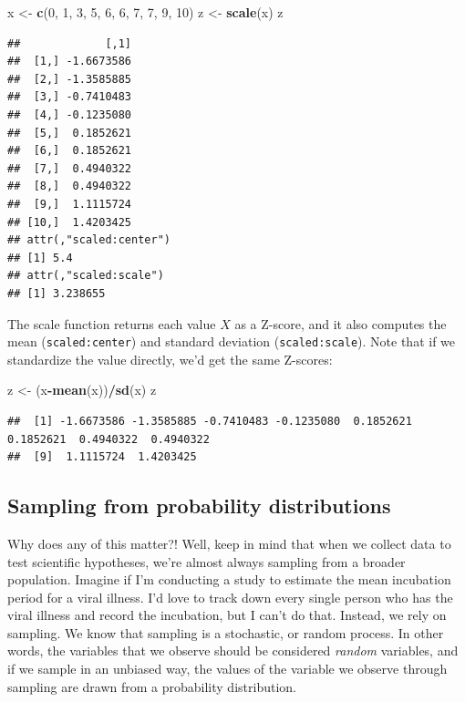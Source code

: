 \documentclass[
]{book}
\newenvironment{Shaded}{\begin{snugshade}}{\end{snugshade}}
\newcommand{\DecValTok}[1]{\textcolor[rgb]{0.00,0.00,0.81}{#1}}
\newcommand{\FunctionTok}[1]{\textcolor[rgb]{0.13,0.29,0.53}{\textbf{#1}}}
\newcommand{\NormalTok}[1]{#1}
\newcommand{\OtherTok}[1]{\textcolor[rgb]{0.56,0.35,0.01}{#1}}
\newcommand{\SpecialCharTok}[1]{\textcolor[rgb]{0.81,0.36,0.00}{\textbf{#1}}}
\begin{document}
\begin{Shaded}
\begin{Highlighting}[]
\NormalTok{x }\OtherTok{\textless{}{-}} \FunctionTok{c}\NormalTok{(}\DecValTok{0}\NormalTok{, }\DecValTok{1}\NormalTok{, }\DecValTok{3}\NormalTok{, }\DecValTok{5}\NormalTok{, }\DecValTok{6}\NormalTok{, }\DecValTok{6}\NormalTok{, }\DecValTok{7}\NormalTok{, }\DecValTok{7}\NormalTok{, }\DecValTok{9}\NormalTok{, }\DecValTok{10}\NormalTok{)}
\NormalTok{z }\OtherTok{\textless{}{-}} \FunctionTok{scale}\NormalTok{(x)}
\NormalTok{z}
\end{Highlighting}
\end{Shaded}

\begin{verbatim}
##             [,1]
##  [1,] -1.6673586
##  [2,] -1.3585885
##  [3,] -0.7410483
##  [4,] -0.1235080
##  [5,]  0.1852621
##  [6,]  0.1852621
##  [7,]  0.4940322
##  [8,]  0.4940322
##  [9,]  1.1115724
## [10,]  1.4203425
## attr(,"scaled:center")
## [1] 5.4
## attr(,"scaled:scale")
## [1] 3.238655
\end{verbatim}

The scale function returns each value \(X\) as a Z-score, and it also computes the mean (\texttt{scaled:center}) and standard deviation (\texttt{scaled:scale}). Note that if we standardize the value directly, we'd get the same Z-scores:

\begin{Shaded}
\begin{Highlighting}[]
\NormalTok{z }\OtherTok{\textless{}{-}}\NormalTok{ (x}\SpecialCharTok{{-}}\FunctionTok{mean}\NormalTok{(x))}\SpecialCharTok{/}\FunctionTok{sd}\NormalTok{(x)}
\NormalTok{z}
\end{Highlighting}
\end{Shaded}

\begin{verbatim}
##  [1] -1.6673586 -1.3585885 -0.7410483 -0.1235080  0.1852621  0.1852621  0.4940322  0.4940322
##  [9]  1.1115724  1.4203425
\end{verbatim}

\subsection{Sampling from probability distributions}\label{sampling-from-probability-distributions}

Why does any of this matter?! Well, keep in mind that when we collect data to test scientific hypotheses, we're almost always sampling from a broader population. Imagine if I'm conducting a study to estimate the mean incubation period for a viral illness. I'd love to track down every single person who has the viral illness and record the incubation, but I can't do that. Instead, we rely on sampling. We know that sampling is a stochastic, or random process. In other words, the variables that we observe should be considered \emph{random} variables, and if we sample in an unbiased way, the values of the variable we observe through sampling are drawn from a probability distribution.
\end{document}
